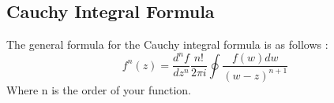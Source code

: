 \documentclass{article}
\newcommand{\be}{\begin{equation}}
\newcommand{\ee}{\end{equation}}
\begin{document}
\subsection*{Cauchy Integral Formula}
The general formula for the Cauchy integral formula is as follows :
\be
f^{n}(z) = \frac{d^n f}{dz^n}  \frac{n!}{2\pi i } \oint \frac{f(w) dw}{(w-z)^{n+1}}
\ee
Where n is the order of your function.
\end{document}

